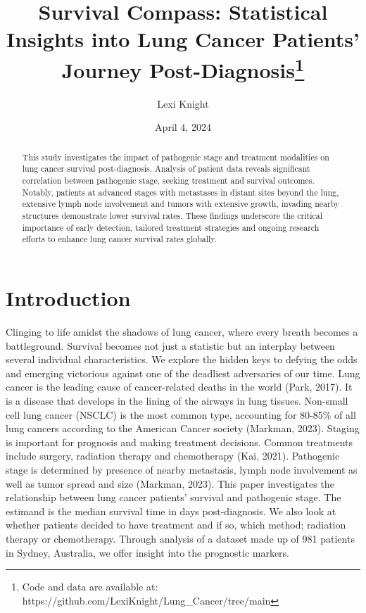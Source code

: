\documentclass[
  letterpaper,
  DIV=11,
  numbers=noendperiod]{scrartcl}
\title{Survival Compass: Statistical Insights into Lung Cancer Patients'
Journey Post-Diagnosis\thanks{Code and data are available at:
https://github.com/LexiKnight/Lung\_Cancer/tree/main}}
\author{Lexi Knight}
\date{April 4, 2024}
\begin{document}
\maketitle
\begin{abstract}
This study investigates the impact of pathogenic stage and treatment
modalities on lung cancer survival post-diagnosis. Analysis of patient
data reveals significant correlation between pathogenic stage, seeking
treatment and survival outcomes. Notably, patients at advanced stages
with metastases in distant sites beyond the lung, extensive lymph node
involvement and tumors with extensive growth, invading nearby structures
demonstrate lower survival rates. These findings underscore the critical
importance of early detection, tailored treatment strategies and ongoing
research efforts to enhance lung cancer survival rates globally.
\end{abstract}
\ifdefined\Shaded\renewenvironment{Shaded}{\begin{tcolorbox}[sharp corners, borderline west={3pt}{0pt}{shadecolor}, boxrule=0pt, interior hidden, breakable, frame hidden, enhanced]}{\end{tcolorbox}}\fi

\hypertarget{introduction}{%
\section{Introduction}\label{introduction}}

Clinging to life amidst the shadows of lung cancer, where every breath
becomes a battleground. Survival becomes not just a statistic but an
interplay between several individual characteristics. We explore the
hidden keys to defying the odds and emerging victorious against one of
the deadliest adversaries of our time. Lung cancer is the leading cause
of cancer-related deaths in the world (Park, 2017). It is a disease that
develops in the lining of the airways in lung tissues. Non-small cell
lung cancer (NSCLC) is the most common type, accounting for 80-85\% of
all lung cancers according to the American Cancer society (Markman,
2023). Staging is important for prognosis and making treatment
decisions. Common treatments include surgery, radiation therapy and
chemotherapy (Kai, 2021). Pathogenic stage is determined by presence of
nearby metastasis, lymph node involvement as well as tumor spread and
size (Markman, 2023). This paper investigates the relationship between
lung cancer patients' survival and pathogenic stage. The estimand is the
median survival time in days post-diagnosis. We also look at whether
patients decided to have treatment and if so, which method; radiation
therapy or chemotherapy. Through analysis of a dataset made up of 981
patients in Sydney, Australia, we offer insight into the prognostic
markers.
\end{document}
